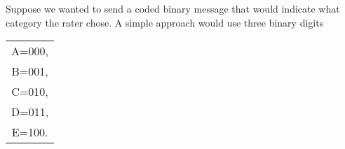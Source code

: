 \begin{frame}
Suppose we wanted to send a coded binary message that would indicate what category the rater chose. A simple approach would use three binary digits




\begin{center}
\begin{tabular}{|c|}
\hline
A=000,\\
B=001,\\
C=010,\\
D=011,\\
E=100.\\


\hline
\end{tabular}
\end{center}


\end{frame}

